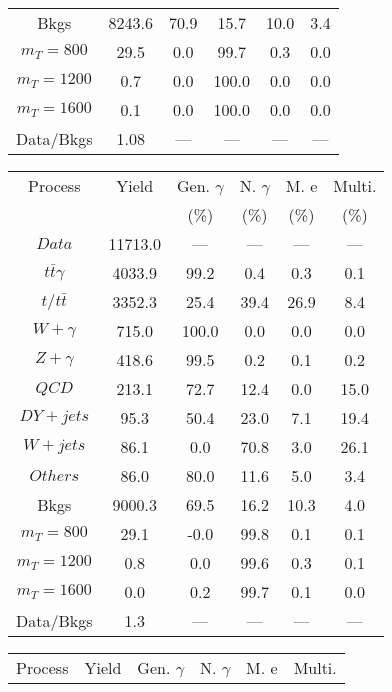 \begin{figure}
\begin{minipage}[c]{0.32\textwidth}
{\begin{tabular}{cccccc}
Bkgs &  8243.6 &  70.9 &  15.7 &  10.0 &  3.4\\
$ m_{T} = 800 $ &  29.5 &  0.0 &  99.7 &  0.3 &  0.0\\
$ m_{T} = 1200 $ &  0.7 &  0.0 &  100.0 &  0.0 &  0.0\\
$ m_{T} = 1600 $ &  0.1 &  0.0 &  100.0 &  0.0 &  0.0\\
Data/Bkgs &  1.08 &  --- &  --- &  --- &  ---\\
\hline
\end{tabular}
}
\end{minipage}
\begin{minipage}[c]{0.32\textwidth}
\centering
\tiny{
\begin{tabular}{cccccc}
\hline
Process & Yield & Gen. $\gamma$ & N. $\gamma$ & M. e & Multi. \\
 &  & (\%) & (\%) & (\%) & (\%)  \\
\hline
                                                                      $ Data $ &  11713.0 &  --- &  --- &  --- &  ---\\
$ t\bar{t}\gamma $ &  4033.9 &  99.2 &  0.4 &  0.3 &  0.1\\
$ t/t\bar{t} $ &  3352.3 &  25.4 &  39.4 &  26.9 &  8.4\\
$ W+\gamma $ &  715.0 &  100.0 &  0.0 &  0.0 &  0.0\\
$ Z+\gamma $ &  418.6 &  99.5 &  0.2 &  0.1 &  0.2\\
$ QCD $ &  213.1 &  72.7 &  12.4 &  0.0 &  15.0\\
$ DY+jets $ &  95.3 &  50.4 &  23.0 &  7.1 &  19.4\\
$ W+jets $ &  86.1 &  0.0 &  70.8 &  3.0 &  26.1\\
$ Others $ &  86.0 &  80.0 &  11.6 &  5.0 &  3.4\\
Bkgs &  9000.3 &  69.5 &  16.2 &  10.3 &  4.0\\
$ m_{T} = 800 $ &  29.1 &  -0.0 &  99.8 &  0.1 &  0.1\\
$ m_{T} = 1200 $ &  0.8 &  0.0 &  99.6 &  0.3 &  0.1\\
$ m_{T} = 1600 $ &  0.0 &  0.2 &  99.7 &  0.1 &  0.0\\
Data/Bkgs &  1.3 &  --- &  --- &  --- &  ---\\
\hline
\end{tabular}
}
\end{minipage}
\begin{minipage}[c]{0.32\textwidth}
\centering
\tiny{
\begin{tabular}{cccccc}
\hline
Process & Yield & Gen. $\gamma$ & N. $\gamma$ & M. e & Multi. \\

\end{tabular}}
\end{minipage}
\end{figure}
